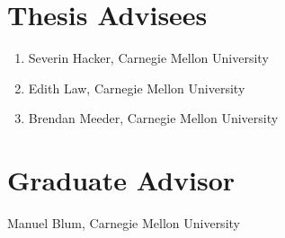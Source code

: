 \documentclass{article}
\newenvironment{denseenumerate}%
	{\begin{enumerate}\setlength{\itemsep}{0pt}\setlength{\parsep}{0pt}}%
	{\end{enumerate}}
\begin{document}
\section*{Thesis Advisees}
\begin{denseenumerate}
\item Severin Hacker, Carnegie Mellon University
\item Edith Law, Carnegie Mellon University
\item Brendan Meeder, Carnegie Mellon University
\end{denseenumerate}

\section*{Graduate Advisor}
Manuel Blum, Carnegie Mellon University

%
\end{document}

